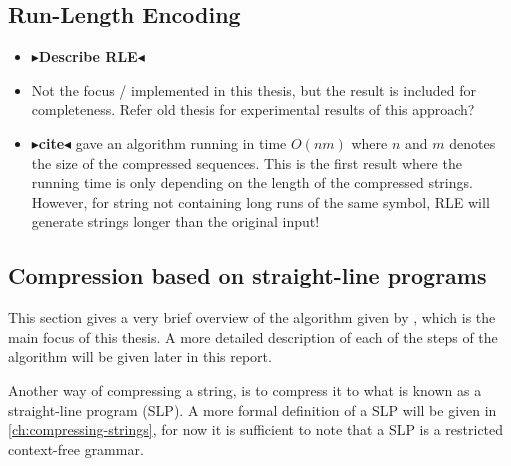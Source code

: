 \documentclass[twoside,11pt,openright]{report}
\newcommand{\todo}[1]{{\color[rgb]{.5,0,0}\textbf{$\blacktriangleright$#1$\blacktriangleleft$}}}
\begin{document}
\subsection{Run-Length Encoding}
\begin{itemize}
  \item \todo{Describe RLE}
  \item Not the focus / implemented in this thesis, but the result is included for completeness. Refer old thesis for experimental results of this approach?
  \item \todo{cite} gave an algorithm running in time $O(nm)$ where $n$ and $m$ denotes the size of the compressed sequences. This is the first result where the running time is only depending on the length of the compressed strings. However, for string not containing long runs of the same symbol, RLE will generate strings longer than the original input!
\end{itemize}

\subsection{Compression based on straight-line programs}
This section gives a very brief overview of the algorithm given by \cite{Gawrychowski:2012:FAC:2422024.2422048}, which is the main focus of this thesis. A more detailed description of each of the steps of the algorithm will be given later in this report. 

Another way of compressing a string, is to compress it to what is known as a straight-line program (SLP). A more formal definition of a SLP will be given in \cref{ch:compressing-strings}, for now it is sufficient to note that a SLP is a restricted context-free grammar.
\end{document}
